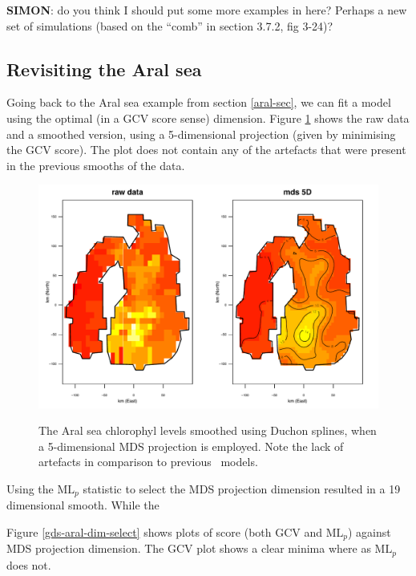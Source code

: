 \textbf{SIMON}: do you think I should put some more examples in here? Perhaps a new set of simulations (based on the ``comb'' in section 3.7.2, fig 3-24)?

\subsection{Revisiting the Aral sea}

Going back to the Aral sea example from section \ref{aral-sec}, we can fit a model using the optimal (in a GCV score sense) dimension. Figure \ref{mds-aral-5d-duchon} shows the raw data and a smoothed version, using a 5-dimensional projection (given by minimising the GCV score). The plot does not contain any of the artefacts that were present in the previous smooths of the data.

\begin{figure}
\centering
\includegraphics[width=6in]{mds/figs/aral-5d-duchon.pdf} \\
\caption{The Aral sea chlorophyl levels smoothed using Duchon splines, when a 5-dimensional MDS projection is employed. Note the lack of artefacts in comparison to previous \mdsap\ models.}
\label{mds-aral-5d-duchon}
\end{figure}

Using the $\text{ML}_p$ statistic to select the MDS projection dimension resulted in a 19 dimensional smooth. While the 

Figure \ref{gds-aral-dim-select} shows plots of score (both GCV and $\text{ML}_p$) against MDS projection dimension. The GCV plot shows a clear minima where as $\text{ML}_p$ does not.


